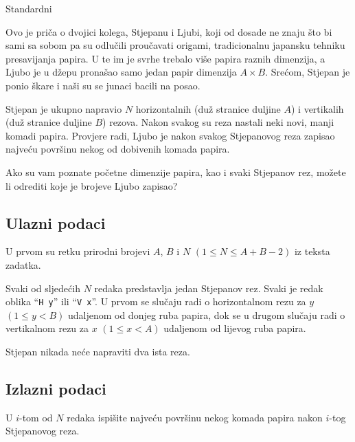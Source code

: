 \begin{statement}[
  problempoints=100,
  timelimit=1 sekunda,
  memorylimit=512 MiB,
]{Standardni}

Ovo je priča o dvojici kolega, Stjepanu i Ljubi, koji od dosade ne znaju što bi
sami sa sobom pa su odlučili proučavati origami, tradicionalnu japansku
tehniku presavijanja papira. U te im je svrhe trebalo više papira raznih
dimenzija, a Ljubo je u džepu pronašao samo jedan papir dimenzija $A\times B$.
Srećom, Stjepan je ponio škare i naši su se junaci bacili na posao.

Stjepan je ukupno napravio $N$ horizontalnih (duž stranice duljine $A$) i
vertikalih (duž stranice duljine $B$) rezova. Nakon svakog su reza nastali
neki novi, manji komadi papira.  Provjere radi, Ljubo je nakon svakog
Stjepanovog reza zapisao najveću površinu nekog od dobivenih komada papira.

Ako su vam poznate početne dimenzije papira, kao i svaki Stjepanov rez, možete
li odrediti koje je brojeve Ljubo zapisao?

\subsection*{Ulazni podaci}
U prvom su retku prirodni brojevi $A$, $B$ i $N$ $(1 \le N \le A + B - 2)$ iz
teksta zadatka.

Svaki od sljedećih $N$ redaka predstavlja jedan Stjepanov rez. Svaki je redak
oblika ``\texttt{H y}'' ili ``\texttt{V x}''. U prvom se slučaju radi o
horizontalnom rezu za $y$ $(1 \le y < B)$ udaljenom od donjeg ruba papira, dok
se u drugom slučaju radi o vertikalnom rezu za $x$ $(1 \le x < A)$ udaljenom
od lijevog ruba papira.

Stjepan nikada neće napraviti dva ista reza.

\subsection*{Izlazni podaci}
U $i$-tom od $N$ redaka ispišite najveću površinu nekog komada papira nakon
$i$-tog Stjepanovog reza.


\end{statement}
